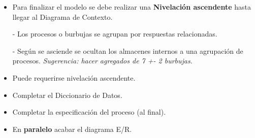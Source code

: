 \begin{itemize}[noitemsep]
\item Para finalizar el modelo se debe realizar una \textbf{Nivelación ascendente} hasta llegar al Diagrama de Contexto.

  - Los procesos o burbujas se agrupan por respuestas relacionadas.

  - Según se asciende se ocultan los almacenes internos a una agrupación de procesos. \textit{Sugerencia: hacer agregados de 7 +- 2 burbujas}.

\item Puede requerirse nivelación ascendente.
\item Completar el Diccionario de Datos.
\item Completar la especificación del proceso (al final).
\item En \textbf{paralelo} acabar el diagrama E/R.
\end{itemize}
